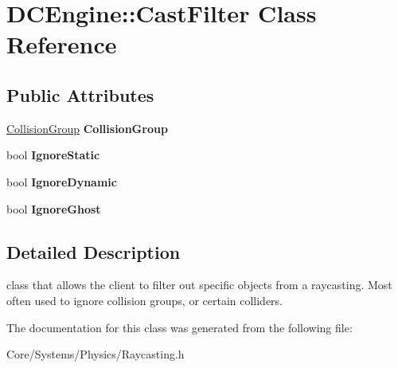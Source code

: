 \hypertarget{structDCEngine_1_1CastFilter}{\section{D\-C\-Engine\-:\-:Cast\-Filter Class Reference}
\label{structDCEngine_1_1CastFilter}
}
\subsection*{Public Attributes}
\begin{DoxyCompactItemize}
\item 
\hypertarget{structDCEngine_1_1CastFilter_a30236ba6966d901267f54fce97e9bd9a}{\hyperlink{classDCEngine_1_1CollisionGroup}{Collision\-Group} {\bfseries Collision\-Group}}\label{structDCEngine_1_1CastFilter_a30236ba6966d901267f54fce97e9bd9a}

\item 
\hypertarget{structDCEngine_1_1CastFilter_a5dbaa93ce9c0a8dc302119d29cbfdf26}{bool {\bfseries Ignore\-Static}}\label{structDCEngine_1_1CastFilter_a5dbaa93ce9c0a8dc302119d29cbfdf26}

\item 
\hypertarget{structDCEngine_1_1CastFilter_a1af9de9617a4353c773871e6fbad7eab}{bool {\bfseries Ignore\-Dynamic}}\label{structDCEngine_1_1CastFilter_a1af9de9617a4353c773871e6fbad7eab}

\item 
\hypertarget{structDCEngine_1_1CastFilter_ae7f7caff43dadcdd3337b84289c2e5d4}{bool {\bfseries Ignore\-Ghost}}\label{structDCEngine_1_1CastFilter_ae7f7caff43dadcdd3337b84289c2e5d4}

\end{DoxyCompactItemize}


\subsection{Detailed Description}
class that allows the client to filter out specific objects from a raycasting. Most often used to ignore collision groups, or certain colliders. 

The documentation for this class was generated from the following file\-:\begin{DoxyCompactItemize}
\item 
Core/\-Systems/\-Physics/Raycasting.\-h\end{DoxyCompactItemize}
